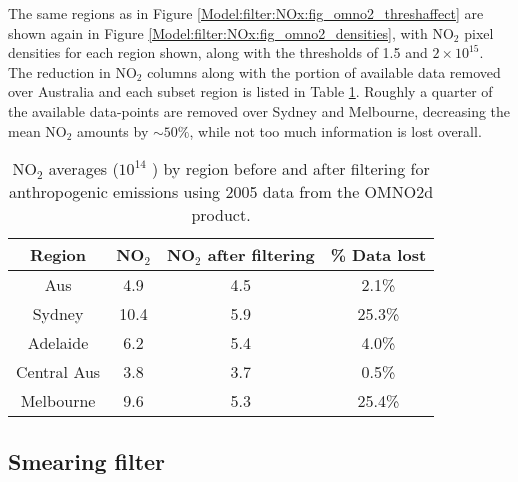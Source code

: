 {    %
    The same regions as in Figure \ref{Model:filter:NOx:fig_omno2_threshaffect} are shown again in Figure \ref{Model:filter:NOx:fig_omno2_densities}, with NO$_2$ pixel densities for each region shown, along with the thresholds of 1.5 and $2 \times 10^{15}$\moleccm.
    The reduction in NO$_2$ columns along with the portion of available data removed over Australia and each subset region is listed in Table \ref{Model:filter:NOx:tab_summary}.
    Roughly a quarter of the available data-points are removed over Sydney and Melbourne, decreasing the mean NO$_2$ amounts by $\sim{50}\%$, while not too much information is lost overall.
    
    
    
    \begin{table}
      \caption{NO$_2$ averages ($10^{14}$ \moleccm) by region before and after filtering for anthropogenic emissions using 2005 data from the OMNO2d product.}
      \begin{tabular}{ c c c c }
        \hline
        \textbf{Region} & \textbf{NO$_2$} & \textbf{NO$_2$ after filtering} & \textbf{\% Data lost} 
        \\ \hline
        Aus         & 4.9  & 4.5  &   2.1\% \\
        Sydney      & 10.4 & 5.9  &  25.3\% \\
        Adelaide    & 6.2  & 5.4  &   4.0\% \\
        Central Aus & 3.8  & 3.7  &   0.5\% \\
        Melbourne   & 9.6  & 5.3  &  25.4\% \\
        \hline
      \end{tabular}
      \label{Model:filter:NOx:tab_summary}
    \end{table}
    
  \subsection{Smearing filter}
    \label{Model:filter:smearing}
    
}
